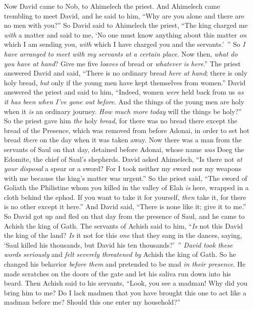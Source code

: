 \begin{biblechapter} %
 Now David came to Nob, to Ahimelech the priest. And Ahimelech came trembling to meet David, and he said to him, “Why are you alone and there are no men with you?”
\verse So David said to Ahimelech the priest, “The king charged me \textit{with} a matter and said to me, ‘No one must know anything about this matter \textit{on} which I am sending you, \textit{with} which I have charged you and the servants.’ ” So \textit{I have arranged to meet with my servants at a certain place}.
\verse Now then, \textit{what do you have at hand}? Give me five \textit{loaves} of bread or \textit{whatever is here}.”
\verse The priest answered David and said, “There is no ordinary bread \textit{here at hand}; there is only holy bread, \textit{but} only if the young men have kept themselves from women.”
\verse David answered the priest and said to him, “Indeed, women \textit{were} held back from us \textit{as it has been when I’ve gone out before}. And the things of the young men are holy when it \textit{is} an ordinary journey. \textit{How much more} \textit{today} will the things be holy?”
\verse So the priest gave him \textit{the} holy \textit{bread}, for there was no bread there except the bread of the Presence, which was removed from before Adonai, in order to set hot bread \textit{there} on the day when it was taken away.
\verse Now there was a man from the servants of Saul on that day, detained before Adonai, whose name \textit{was} Doeg the Edomite, the chief of Saul’s shepherds.
\verse David asked Ahimelech, “Is there not \textit{at your disposal} a spear or a sword? For I took neither my sword nor my weapons with me because the king’s matter was urgent.”
\verse So the priest said, “The sword of Goliath the Philistine whom you killed in the valley of Elah \textit{is} here, wrapped in a cloth behind the ephod. If you want to take it for yourself, \textit{then} take it, for there is no other except it here.” And David said, “There is none like it; give it to me.”
 So David got up and fled on that day from the presence of Saul, and he came to Achish the king of Gath.
\verse The servants of Achish said to him, “\textit{Is} not this David the king of the land? \textit{Is} it not for this \textit{one} that they sang in the dances, saying, ‘Saul killed his thousands, but David his ten thousands?’ ”
\verse \textit{David took these words seriously} and \textit{felt severely threatened by} Achish the king of Gath.
\verse So he changed his behavior \textit{before them} and pretended to be mad \textit{in their presence}. He made scratches on the doors of the gate and let his saliva run down into his beard.
\verse Then Achish said to his servants, “Look, you see a madman! Why did you bring him to me?
\verse Do I lack madmen that you have brought this one to act like a madman before me? Should this one enter my household?”
\end{biblechapter}

